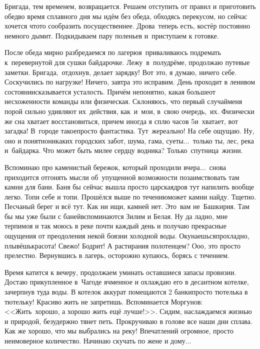 Бригада, тем временем, возвращается. Решаем отступить от правил и приготовить обед\mdash во время сплавного дня мы идём без обеда, обходясь перекусом, но сейчас хочется что\sdash то сообразить посущественнее. Дрова~теперь есть, костёр постоянно немного дымит. Подкидываем пару поленьев и~приступаем к готовке.

После обеда мирно разбредаемся по лагерю\mdash я~приваливаюсь подремать к~перевернутой для сушки байдарочке. Лежу~в~полудрёме, продолжаю путевые заметки. Бригада,~отдохнув, делает зарядку! Вот это, я думаю, ничего себе. Соскучились по нагрузке! Ничего, завтра это исправим. День проходит в ленивом состоянии\mdash сказывается усталость. Причём непонятно, какая больше\mdash от несхоженности команды или физическая. Склоняюсь, что первый случай\mdash меня порой сильно удивляют их~действия, как~и~мои, в~свою очередь,~их. Физически же сна хватает восстановиться, причем иногда я сплю часов 5\mdash и~хватает, вот загадка! В~городе такое\mdash просто фантастика. Тут~же\mdash реально! На себе ощущаю. Ну, оно и понятно\mdash никаких городских забот, шума, гама, суеты$\ldots$~только ты, лес, река и~байдарка. Что может быть милее сердцу водника? Только~спутница~жизни.

Вспоминаю про каменистый бережок, который проходили вчера$\ldots$~снова приходится отгонять мысли об~упущенной возможности позаимствовать там камни для бани. Баня бы сейчас вышла просто царская\mdash дров тут напилить вообще легко. Топи себе и топи. Прошёлся выше по течению\mdash может камни найду. Тщетно. Песчаный берег и всё тут. Как ни ищи, камней нет. Это~вам не~Башкирия. Там бы мы уже были с баней\mdash вспоминаются Зилим и Белая. Ну да ладно, мне терпимо\mdash я и так моюсь в реке почти каждый день и получаю прекрасные ощущения от преодоления некой боязни холодной воды. Окунаешься\mdash прохладно, плывёшь\mdash красота! Свежо! Бодрит! А растирания полотенцем? О\sdash о\sdash о, это просто прелестно. Вернувшись в лагерь, осторожно купаюсь, борясь с течением. 

Время катится к вечеру, продолжаем уминать оставшиеся запасы провизии. Достаю прикупленное в~Чагоде ячменное и охлаждаю его в десантном котелке, зачерпнув туда воды. В котелок аккурат помещаются 2 банки\mdash просто тютелька в тютельку! Красиво жить не запретишь. Вспоминается Моргунов: <<Жить~хорошо, а хорошо жить ещё лучше!>>. Сидим, наслаждаемся жизнью и природой, безудержно тянет петь. Прокручиваю в голове все наши дни сплава. Как же хорошо, что мы выбрались на реку! Впечатлений огромное, просто неимоверное количество. Начинаю скучать по жене и дому$\ldots$

